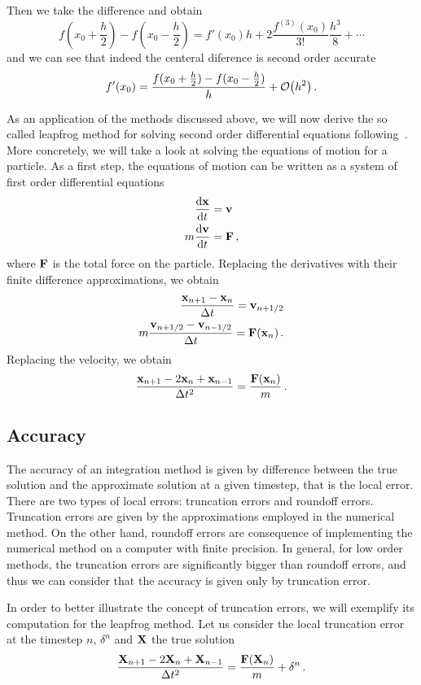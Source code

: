 \documentclass[12pt, class=report, crop=false]{standalone}
\begin{document}
Then we take the difference and obtain
\[
  f(x_0+\frac{h}{2}) - f(x_0-\frac{h}{2}) = f'(x_0)h
    + 2\frac{f^{(3)}(x_0)}{3!}\frac{h^3}{8} + \dotsb
\]
and we can see that indeed the centeral diference is second order accurate
\[
  f'(x_0) = \frac{f(x_0+\frac{h}{2}) - f(x_0-\frac{h}{2})}{h} + \order{h^2}\,.
\]

As an application of the methods discussed above, we will now derive the so called
leapfrog method for solving second order differential equations
following~\textcite[Chapter~4]{hockney_computersimulation_1988}. More concretely,
we will take a look at solving the equations of motion for a particle. As a first
step, the equations of motion can be written as a system of first order differential
equations
\begin{align*}
  \dv{\vb{x}}{t} &= \vb{v} \\
  m \dv{\vb{v}}{t} &= \vb{F}\,,
\end{align*}
where \(\vb{F}\) is the total force on the particle. Replacing the derivatives
with their finite difference approximations, we obtain
\begin{align*}
  \frac{\vb{x}_{n+1} - \vb{x}_n}{\Delta t} = \vb{v}_{n+1/2} \\
  m \frac{\vb{v}_{n+1/2} - \vb{v}_{n-1/2}}{\Delta t} = \vb{F}(\vb{x}_n)\,.
\end{align*}
Replacing the velocity, we obtain
\begin{equation}
  \label{eq:leapfrog}
  \frac{\vb{x}_{n+1}-2\vb{x}_n+\vb{x}_{n-1}}{\Delta t^2} = \frac{\vb{F}(\vb{x}_n)}{m}\,.
\end{equation}

\subsection{Accuracy}

The accuracy of an integration method is given by difference between the true
solution and the approximate solution at a given timestep, that is the local
error. There are two types of local errors: truncation errors and roundoff errors.
Truncation errors are given by the approximations employed in the numerical method.
On the other hand, roundoff errors are consequence of implementing the numerical
method on a computer with finite precision. In general, for low order methods,
the truncation errors are significantly bigger than roundoff errors, and thus
we can consider that the accuracy is given only by truncation error.

In order to better illustrate the concept of truncation errors, we will exemplify
its computation for the leapfrog method. Let us consider the local truncation
error at the timestep \(n\), \(\delta^n\) and \(\vb{X}\) the true solution
\[
  \frac{\vb{X}_{n+1}-2\vb{X}_n+\vb{X}_{n-1}}{\Delta t^2} = \frac{\vb{F}(\vb{X}_n)}{m} + \delta^n\,.
\]
\end{document}
